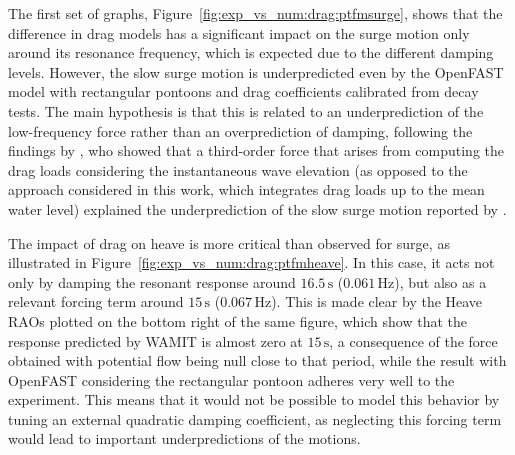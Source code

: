 The first set of graphs, Figure~\ref{fig:exp_vs_num:drag:ptfmsurge}, shows that the difference in drag models has a significant impact on the surge motion only around its resonance frequency, which is expected due to the different damping levels. However, the slow surge motion is underpredicted even by the OpenFAST model with rectangular pontoons and drag coefficients calibrated from decay tests. The main hypothesis is that this is related to an underprediction of the low-frequency force rather than an overprediction of damping, following the findings by \citet{wang2022oc6}, who showed that a third-order force that arises from computing the drag loads considering the instantaneous wave elevation (as opposed to the approach considered in this work, which integrates drag loads up to the mean water level) explained the underprediction of the slow surge motion reported by \cite{OC52017}. 

The impact of drag on heave is more critical than observed for surge, as illustrated in Figure~\ref{fig:exp_vs_num:drag:ptfmheave}. In this case, it acts not only by damping the resonant response around $16.5\,\text{s}$ ($0.061\,\text{Hz}$), but also as a relevant forcing term around $15\,\text{s}$ ($0.067\,\text{Hz}$). This is made clear by the Heave RAOs plotted on the bottom right of the same figure, which show that the response predicted by WAMIT is almost zero at $15\,\text{s}$, a consequence of the force obtained with potential flow being null close to that period, while the result with OpenFAST considering the rectangular pontoon adheres very well to the experiment. This means that it would not be possible to model this behavior by tuning an external quadratic damping coefficient, as neglecting this forcing term would lead to important underpredictions of the motions. 

